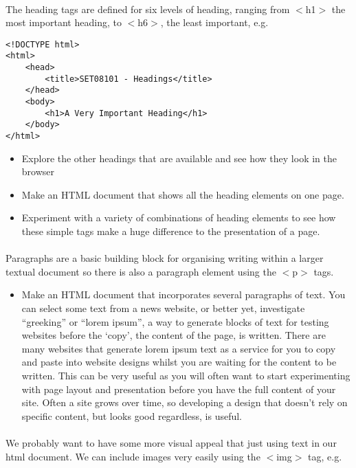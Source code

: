 \documentclass[10pt, a4paper]{article}
\begin{document}
\paragraph{} The heading tags are defined for six levels of heading, ranging from $<$h1$>$ the most important heading, to $<$h6$>$, the least important, e.g.

\begin{lstlisting}
<!DOCTYPE html>
<html>
    <head>
        <title>SET08101 - Headings</title>
    </head>
    <body>
        <h1>A Very Important Heading</h1>      
    </body>
</html>
\end{lstlisting}

\begin{itemize}
\item Explore the other headings that are available and see how they look in the browser
\item Make an HTML document that shows all the heading elements on one page.
\item Experiment with a variety of combinations of heading elements to see how these simple tags make a huge difference to the presentation of a page.
\end{itemize}

\paragraph{} Paragraphs are a basic building block for organising writing within a larger textual document so there is also a paragraph element using the $<$p$>$ tags.

\begin{itemize}
\item Make an HTML document that incorporates several paragraphs of text. You can select some text from a news website, or better yet, investigate ``greeking'' or ``lorem ipsum'', a way to generate blocks of text for testing websites before the `copy', the content of the page, is written. There are many websites that generate lorem ipsum text as a service for you to copy and paste into website designs whilst you are waiting for the content to be written. This can be very useful as you will often want to start experimenting with page layout and presentation before you have the full content of your site. Often a site grows over time, so developing a design that doesn't rely on specific content, but looks good regardless, is useful.
\end{itemize}

\paragraph{} We probably want to have some more visual appeal that just using text in our html document. We can include images very easily using the $<$img$>$ tag, e.g.
\end{document}
